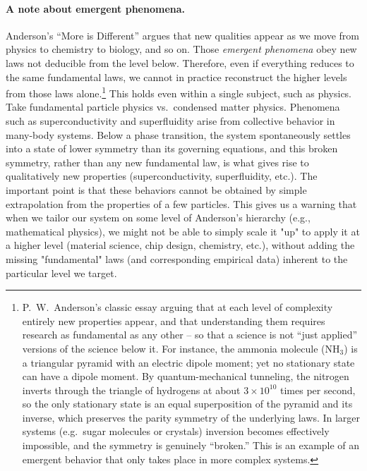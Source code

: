\paragraph{A note about emergent phenomena.}
Anderson's ``More is Different'' \cite{Anderson1972}
argues that new qualities appear as we move from physics to chemistry to biology, and so on. Those \emph{emergent phenomena} obey new laws not deducible from the level below. Therefore, even if everything reduces to the same fundamental laws, we cannot in practice reconstruct the higher levels from those laws alone.\footnote{%
    P.~W.~Anderson's classic essay arguing that at each level of complexity entirely new properties appear, and that understanding them requires research as fundamental as any other -- so that a science is not ``just applied'' versions of the science below it.
    For instance, the ammonia molecule (NH$_3$) is a triangular pyramid with an electric dipole moment; yet no stationary state can have a dipole moment. By quantum-mechanical tunneling, the nitrogen inverts through the triangle of hydrogens at about $3\times10^{10}$ times per second, so the only stationary state is an equal superposition of the pyramid and its inverse, which preserves the parity symmetry of the underlying laws. In larger systems (e.g.\ sugar molecules or crystals) inversion becomes effectively impossible, and the symmetry is genuinely ``broken.'' This is an example of an emergent behavior that only takes place in more complex systems.
    }
This holds even within a single subject, such as physics. Take fundamental particle physics vs.\ condensed matter physics. Phenomena such as superconductivity and superfluidity arise from collective behavior in many-body systems. Below a phase transition, the system spontaneously settles into a state of lower symmetry than its governing equations, and this broken symmetry, rather than any new fundamental law, is what gives rise to qualitatively new properties (superconductivity, superfluidity, etc.). The important point is that these behaviors cannot be obtained by simple extrapolation from the properties of a few particles. This gives us a warning that when we tailor our system on some level of Anderson's hierarchy (e.g., mathematical physics), we might not be able to simply scale it "up" to apply it at a higher level (material science, chip design, chemistry, etc.), without adding the missing "fundamental" laws (and corresponding empirical data) inherent to the particular level we target.

